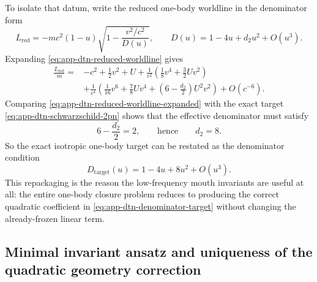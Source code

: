\documentclass[11pt]{article}
\begin{document}
To isolate that datum, write the reduced one-body worldline in the denominator form
\begin{equation}
L_{\mathrm{red}}
=-mc^2(1-u)\sqrt{1-\frac{v^2/c^2}{D(u)}},
\qquad
D(u)=1-4u+d_2u^2+O(u^3).
\label{eq:app-dtn-reduced-worldline}
\end{equation}
Expanding \cref{eq:app-dtn-reduced-worldline} gives
\begin{align}
\frac{L_{\mathrm{red}}}{m}
={}&-c^2+\frac12v^2+U
+\frac{1}{c^2}\left(\frac18v^4+\frac32Uv^2\right)
\nonumber\\
&
+\frac{1}{c^4}\left(
\frac1{16}v^6+\frac78Uv^4+
\left(6-\frac{d_2}{2}\right)U^2v^2
\right)
+O(c^{-6}).
\label{eq:app-dtn-reduced-worldline-expanded}
\end{align}
Comparing \cref{eq:app-dtn-reduced-worldline-expanded} with the exact target
\cref{eq:app-dtn-schwarzschild-2pn} shows that the effective denominator must satisfy
\begin{equation}
6-\frac{d_2}{2}=2,
\qquad\text{hence}\qquad
d_2=8.
\label{eq:app-dtn-d2-solve}
\end{equation}
So the exact isotropic one-body target can be restated as the denominator condition
\begin{equation}
D_{\mathrm{target}}(u)=1-4u+8u^2+O(u^3).
\label{eq:app-dtn-denominator-target}
\end{equation}
This repackaging is the reason the low-frequency mouth invariants are useful at all: the
entire one-body closure problem reduces to producing the correct quadratic coefficient in
\cref{eq:app-dtn-denominator-target} without changing the already-frozen linear term.

\subsection{Minimal invariant ansatz and uniqueness of the quadratic geometry correction}
\label{app:one-body-dtn-uniqueness}
\end{document}
